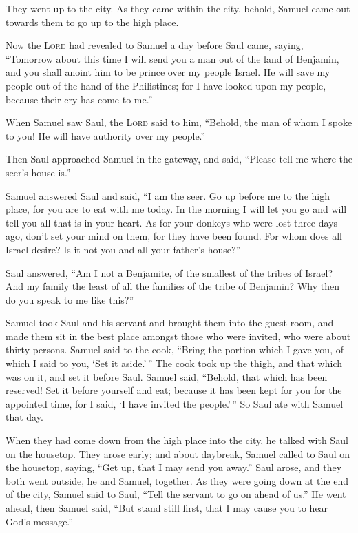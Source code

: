  They went up to the city. As they came within the city,
behold, Samuel came out towards them to go up to the high place.

 Now the \textsc{Lord} had revealed to Samuel a day
before Saul came, saying,  ``Tomorrow about this time I
will send you a man out of the land of Benjamin, and you shall anoint
him to be prince over my people Israel. He will save my people out of
the hand of the Philistines; for I have looked upon my people, because
their cry has come to me.''

 When Samuel saw Saul, the \textsc{Lord} said to him,
``Behold, the man of whom I spoke to you! He will have authority over my
people.''

 Then Saul approached Samuel in the gateway, and said,
``Please tell me where the seer's house is.''

 Samuel answered Saul and said, ``I am the seer. Go up
before me to the high place, for you are to eat with me today. In the
morning I will let you go and will tell you all that is in your heart.
 As for your donkeys who were lost three days ago, don't
set your mind on them, for they have been found. For whom does all
Israel desire? Is it not you and all your father's house?''

 Saul answered, ``Am I not a Benjamite, of the smallest
of the tribes of Israel? And my family the least of all the families of
the tribe of Benjamin? Why then do you speak to me like this?''

 Samuel took Saul and his servant and brought them into
the guest room, and made them sit in the best place amongst those who
were invited, who were about thirty persons.  Samuel said
to the cook, ``Bring the portion which I gave you, of which I said to
you, `Set it aside.'\,''  The cook took up the thigh, and
that which was on it, and set it before Saul. Samuel said, ``Behold,
that which has been reserved! Set it before yourself and eat; because it
has been kept for you for the appointed time, for I said, `I have
invited the people.'\,'' So Saul ate with Samuel that day.

 When they had come down from the high place into the
city, he talked with Saul on the housetop.  They arose
early; and about daybreak, Samuel called to Saul on the housetop,
saying, ``Get up, that I may send you away.'' Saul arose, and they both
went outside, he and Samuel, together.  As they were
going down at the end of the city, Samuel said to Saul, ``Tell the
servant to go on ahead of us.'' He went ahead, then Samuel said, ``But
stand still first, that I may cause you to hear God's message.''

